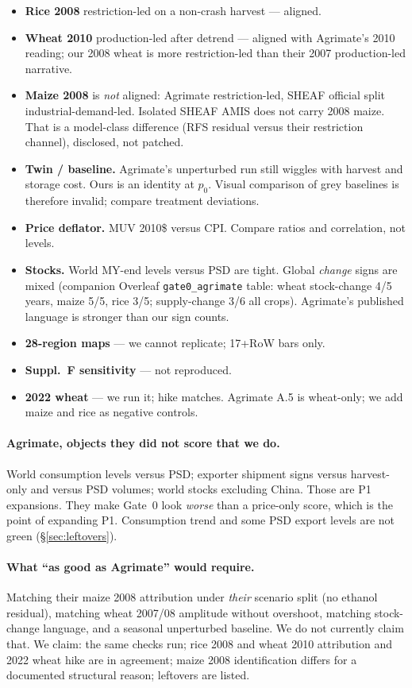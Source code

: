 \documentclass[11pt,a4paper]{article}
\begin{document}
\begin{itemize}
\item \textbf{Rice 2008} restriction-led on a non-crash harvest --- aligned.
\item \textbf{Wheat 2010} production-led after detrend --- aligned with
      Agrimate's 2010 reading; our 2008 wheat is more restriction-led than
      their 2007 production-led narrative.
\item \textbf{Maize 2008} is \emph{not} aligned: Agrimate restriction-led,
      SHEAF official split industrial-demand-led. Isolated SHEAF AMIS does
      not carry 2008 maize. That is a model-class difference (RFS residual
      versus their restriction channel), disclosed, not patched.
\item \textbf{Twin / baseline.} Agrimate's unperturbed run still wiggles
      with harvest and storage cost. Ours is an identity at $p_0$. Visual
      comparison of grey baselines is therefore invalid; compare treatment
      deviations.
\item \textbf{Price deflator.} MUV 2010\$ versus CPI. Compare ratios and
      correlation, not levels.
\item \textbf{Stocks.} World MY-end levels versus PSD are tight. Global
      \emph{change} signs are mixed (companion Overleaf
      \texttt{gate0\_agrimate} table: wheat stock-change 4/5 years, maize
      5/5, rice 3/5; supply-change 3/6 all crops). Agrimate's published
      language is stronger than our sign counts.
\item \textbf{28-region maps} --- we cannot replicate; 17+RoW bars only.
\item \textbf{Suppl.~F sensitivity} --- not reproduced.
\item \textbf{2022 wheat} --- we run it; hike matches. Agrimate A.5 is
      wheat-only; we add maize and rice as negative controls.
\end{itemize}

\paragraph{Agrimate, objects they did not score that we do.}
World consumption levels versus PSD; exporter shipment signs versus
harvest-only and versus PSD volumes; world stocks excluding China. Those
are P1 expansions. They make Gate~0 look \emph{worse} than a price-only
score, which is the point of expanding P1. Consumption trend and some PSD
export levels are not green (\S\ref{sec:leftovers}).

\paragraph{What ``as good as Agrimate'' would require.}
Matching their maize 2008 attribution under \emph{their} scenario split
(no ethanol residual), matching wheat 2007/08 amplitude without overshoot,
matching stock-change language, and a seasonal unperturbed baseline. We
do not currently claim that. We claim: the same checks run; rice 2008 and
wheat 2010 attribution and 2022 wheat hike are in agreement; maize 2008
identification differs for a documented structural reason; leftovers are
listed.
\end{document}
